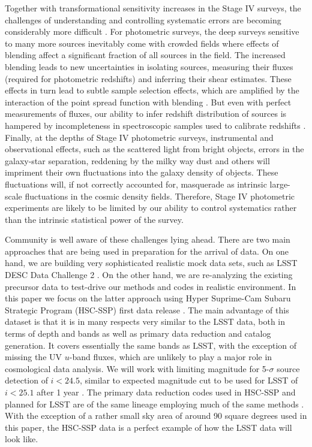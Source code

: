\documentclass[a4paper,11pt]{article}
\begin{document}
Together with transformational sensitivity increases in the Stage IV surveys, the challenges of understanding and controlling systematic errors are becoming considerably more difficult \cite{1808.07335}. For photometric surveys, the deep surveys sensitive to many more sources inevitably come with crowded fields where effects of blending affect a significant fraction of all sources in the field. The increased blending leads to new uncertainties in isolating sources, measuring their fluxes (required for photometric redshifts) and inferring their shear estimates. These effects in turn lead to subtle sample selection effects, which are amplified by the interaction of the point spread function with blending \cite{1708.01533,1905.01324,1907.10572}. But even with perfect measurements of fluxes, our ability to infer redshift distribution of sources is hampered by incompleteness in spectroscopic samples used to calibrate redshifts \cite{1903.09325}. Finally, at the depths of Stage IV photometric surveys, instrumental and observational effects, such as the scattered light from bright objects, errors in the galaxy-star separation, reddening by the milky way dust and others will impriment their own fluctuations into the galaxy density of objects. These fluctuations will, if not correctly accounted for, masquerade as intrinsic large-scale fluctuations in the cosmic density fields.  Therefore, Stage IV photometric experiments are likely to be limited by our ability to control systematics rather than the intrinsic statistical power of the survey.

Community is well aware of these challenges lying ahead. There are two main approaches that are being used in preparation for the arrival of data. On one hand, we are building very sophisticated realistic mock data sets, such as LSST DESC Data Challenge 2 \cite{1909.07340,1907.06530}. On the other hand, we are re-analyzing the existing precursor data to test-drive our methods and codes in realistic environment. In this paper we focus on the latter approach using Hyper Suprime-Cam Subaru Strategic Program (HSC-SSP) first data release  \cite{2018PASJ...70S...8A}. The main advantage of this dataset is that it is in many respects very similar to the LSST data, both in terms of depth and bands as well as primary data reduction and catalog generation. It covers essentially the same bands as LSST, with the exception of missing the UV $u$-band fluxes, which are unlikely to play a major role in cosmological data analysis. We will work with limiting magnitude for 5-$\sigma$ source detection of $i<24.5$, similar to expected magnitude cut to be used for LSST of $i<25.1$ after 1 year \cite{1809.01669}.  The primary data reduction codes used in HSC-SSP and planned for LSST are of the same lineage employing much of the same methods \cite{2018PASJ...70S...5B,1812.03248}. With the exception of a rather small sky area of around 90 square degrees used in this paper, the HSC-SSP data is a perfect example of how the LSST data will look like.
\end{document}

